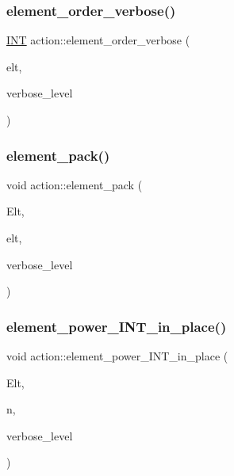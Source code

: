 \mbox{\label{classaction_add2dfd7b5222e51853d8f8dfd53eb95d}} 
\subsubsection{\texorpdfstring{element\+\_\+order\+\_\+verbose()}{element\_order\_verbose()}}
{\footnotesize\ttfamily \mbox{\hyperlink{galois_8h_a09fddde158a3a20bd2dcadb609de11dc}{I\+NT}} action\+::element\+\_\+order\+\_\+verbose (\begin{DoxyParamCaption}\item[{void $\ast$}]{elt,  }\item[{\mbox{\hyperlink{galois_8h_a09fddde158a3a20bd2dcadb609de11dc}{I\+NT}}}]{verbose\+\_\+level }\end{DoxyParamCaption})}

\mbox{\label{classaction_a48a10a87c09b4b37c36eac1180884140}} 
\subsubsection{\texorpdfstring{element\+\_\+pack()}{element\_pack()}}
{\footnotesize\ttfamily void action\+::element\+\_\+pack (\begin{DoxyParamCaption}\item[{void $\ast$}]{Elt,  }\item[{void $\ast$}]{elt,  }\item[{\mbox{\hyperlink{galois_8h_a09fddde158a3a20bd2dcadb609de11dc}{I\+NT}}}]{verbose\+\_\+level }\end{DoxyParamCaption})}

\mbox{\label{classaction_a960e23ddda7996a5573759048949dac0}} 
\subsubsection{\texorpdfstring{element\+\_\+power\+\_\+\+I\+N\+T\+\_\+in\+\_\+place()}{element\_power\_INT\_in\_place()}}
{\footnotesize\ttfamily void action\+::element\+\_\+power\+\_\+\+I\+N\+T\+\_\+in\+\_\+place (\begin{DoxyParamCaption}\item[{\mbox{\hyperlink{galois_8h_a09fddde158a3a20bd2dcadb609de11dc}{I\+NT}} $\ast$}]{Elt,  }\item[{\mbox{\hyperlink{galois_8h_a09fddde158a3a20bd2dcadb609de11dc}{I\+NT}}}]{n,  }\item[{\mbox{\hyperlink{galois_8h_a09fddde158a3a20bd2dcadb609de11dc}{I\+NT}}}]{verbose\+\_\+level }\end{DoxyParamCaption})}

